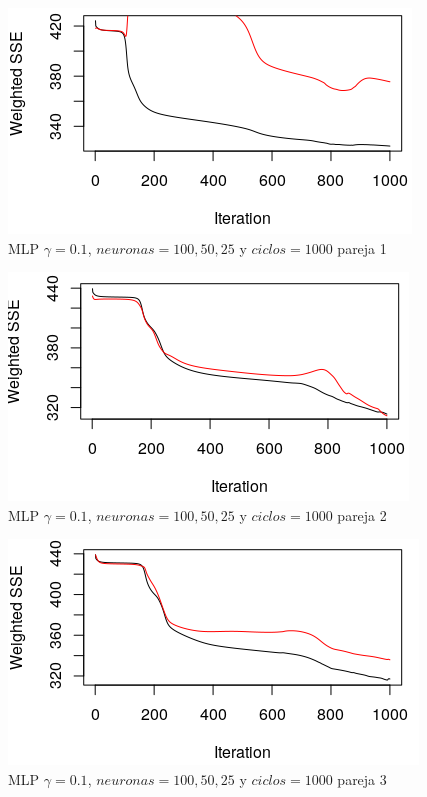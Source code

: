 \documentclass[11pt,spanish,listoffigures,listoftables]{workluis}
\begin{document}
\begin{figure}[H]
\centering
\includegraphics[scale=0.5]{0110050251}
\caption{MLP $\gamma = 0.1$, $neuronas = 100,50,25$ y $ciclos = 1000$ pareja 1}
\end{figure} 

\begin{figure}[H]
\centering
\includegraphics[scale=0.5]{0110050252}
\caption{MLP $\gamma = 0.1$, $neuronas = 100,50,25$ y $ciclos = 1000$ pareja 2}
\end{figure} 

\begin{figure}[H]
\centering
\includegraphics[scale=0.5]{0110050253}
\caption{MLP $\gamma = 0.1$, $neuronas = 100,50,25$ y $ciclos = 1000$ pareja 3}
\end{figure} 
\end{document}
